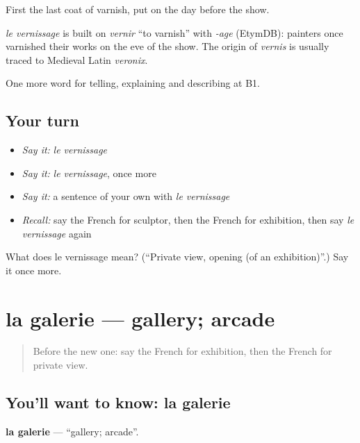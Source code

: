 First the last coat of varnish, put on the day before the show.

\begin{cousinweb}
\emph{le vernissage} is built on \emph{vernir} \textquotedblleft{}to varnish\textquotedblright{} with \emph{-age} (EtymDB): painters once varnished their works on the eve of the show. The origin of \emph{vernis} is usually traced to Medieval Latin \emph{veronix}.
\end{cousinweb}

\begin{grammarlens}[title={What you've built}]
One more word for telling, explaining and describing at B1.
\end{grammarlens}

\subsection*{Your turn}
\begin{itemize}
\raggedright
  \item \emph{Say it:} \emph{le vernissage}
  \item \emph{Say it:} \emph{le vernissage}, once more
  \item \emph{Say it:} a sentence of your own with \emph{le vernissage}
  \item \emph{Recall:} say the French for sculptor, then the French for exhibition, then say \emph{le vernissage} again
\end{itemize}

\begin{tcolorbox}[breakable,colback=teal!4,colframe=teal!35!black,title={Before you move on}]
What does le vernissage mean? (\textquotedblleft{}Private view, opening (of an exhibition)\textquotedblright{}.) Say it once more.
\end{tcolorbox}
\section[la galerie]{la galerie — gallery; arcade}

\label{lesson:FR-C518-galerie}



\begin{quote}
Before the new one: say the French for exhibition, then the French for private view.
\end{quote}

\subsection*{You'll want to know: la galerie}
\textbf{la galerie} — \textquotedblleft{}gallery; arcade\textquotedblright{}.


